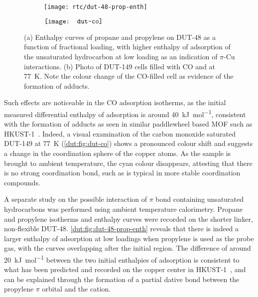 \begin{figure}[htb]
    \centering
    \begin{subfigure}[c]{0.5\linewidth}
        \texttt{[image: rtc/dut-48-prop-enth]}%
        \caption{}\label{dut:fig:dut-48-prop-enth}
    \end{subfigure}%
    \begin{subfigure}[h]{0.5\linewidth}
        \centering
        \(\vcenter{\hbox{{\texttt{[image: dut-co]}}}}\)%
        \caption{}\label{dut:fig:dut-co}
    \end{subfigure}%
    \caption{(a) Enthalpy curves of propane and propylene on DUT-48 as 
    a function of fractional loading, with higher enthalpy of 
    adsorption of the unsaturated hydrocarbon at low loading as an 
    indication of \(\pi\)-Cu interactions. (b) Photo of DUT-149 cells
    filled with CO and  at \SI{77}{\kelvin}. Note the 
    colour change of the CO-filled cell as evidence of the formation of 
     adducts.}%
    \label{dut:fig:dut-48-prop}
\end{figure}

Such effects are noticeable in the CO adsorption isotherms, 
as the initial measured differential enthalpy of adsorption is around 
\SI{40}{\kilo\joule\per\mol}, consistent with the formation of 
 adducts as seen in similar paddlewheel based 
MOF such as HKUST-1~\cite{prestipinoLocalStructureFramework2006}. 
Indeed, a visual examination of the carbon monoxide saturated 
DUT-149 at \SI{77}{\kelvin} 
(\autoref{dut:fig:dut-co}) shows a pronounced colour shift and 
suggests a change in the coordination sphere of the copper 
atoms. As the sample is brought to ambient temperature, the 
cyan colour disappears, attesting that there is no strong 
coordination bond, such as is typical in more stable 
 coordination compounds.

A separate study on the possible interaction of 
\(\pi\) bond containing unsaturated hydrocarbons was performed
using ambient temperature calorimetry. Propane and propylene 
isotherms and enthalpy curves were recorded on the shorter 
linker, non-flexible DUT-48. \autoref{dut:fig:dut-48-prop-enth}
reveals that there is indeed a larger enthalpy of adsorption
at low loadings when propylene is used as the probe gas, with 
the curves overlapping after the initial region. The difference 
of around \SI{20}{\kilo\joule\per\mol} between the two initial
enthalpies of adsorption is consistent to what has been predicted
and recorded on the copper center in 
HKUST-1~\cite{rubesAdsorptionPropanePropylene2013}, and can
be explained through the formation of a partial dative bond
between the propylene \(\pi\) orbital and the 
cation. 


